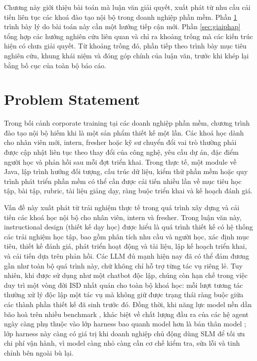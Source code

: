 \documentclass[../main.tex]{subfiles}
\begin{document}
Chương này giới thiệu bài toán mà luận văn giải quyết, xuất phát từ nhu cầu cải tiến liên tục các khoá đào tạo nội bộ trong doanh nghiệp phần mềm. Phần \ref{sec:dvd} trình bày lý do bài toán này cần một hướng tiếp cận mới. Phần \ref{sec:giaiphap} tổng hợp các hướng nghiên cứu liên quan và chỉ ra khoảng trống mà các kiến trúc hiện có chưa giải quyết. Từ khoảng trống đó, phần tiếp theo trình bày mục tiêu nghiên cứu, khung khái niệm và đóng góp chính của luận văn, trước khi khép lại bằng bố cục của toàn bộ báo cáo.

\section{Problem Statement}
\label{sec:dvd}

Trong bối cảnh corporate training tại các doanh nghiệp phần mềm, chương trình đào tạo nội bộ hiếm khi là một sản phẩm thiết kế một lần. Các khoá học dành cho nhân viên mới, intern, fresher hoặc kỹ sư chuyển đổi vai trò thường phải được cập nhật liên tục theo thay đổi của công nghệ, yêu cầu dự án, đặc điểm người học và phản hồi sau mỗi đợt triển khai. Trong thực tế, một module về Java, lập trình hướng đối tượng, cấu trúc dữ liệu, kiểm thử phần mềm hoặc quy trình phát triển phần mềm có thể cần được cải tiến nhiều lần về mục tiêu học tập, bài tập, rubric, tài liệu giảng dạy, ràng buộc triển khai và kế hoạch đánh giá.

Vấn đề này xuất phát từ trải nghiệm thực tế trong quá trình xây dựng và cải tiến các khoá học nội bộ cho nhân viên, intern và fresher. Trong luận văn này, instructional design (thiết kế dạy học) được hiểu là quá trình thiết kế có hệ thống các trải nghiệm học tập, bao gồm phân tích nhu cầu và người học, xác định mục tiêu, thiết kế đánh giá, phát triển hoạt động và tài liệu, lập kế hoạch triển khai, và cải tiến dựa trên phản hồi. Các \gls{LLM} đủ mạnh hiện nay đã có thể đảm đương gần như toàn bộ quá trình này, chứ không chỉ hỗ trợ từng tác vụ riêng lẻ. Tuy nhiên, khi được sử dụng như một chatbot độc lập, chúng còn hạn chế trong việc duy trì một vòng đời \gls{ISD} nhất quán cho toàn bộ khoá học: mỗi lượt tương tác thường xử lý độc lập một tác vụ mà không giữ được trạng thái ràng buộc giữa các thành phần thiết kế đã sinh trước đó. Đồng thời, khi năng lực model nền dần bão hoà trên nhiều benchmark \cite{deveci2025ouroboros,shukla2025scalingwall}, khác biệt về chất lượng đầu ra của các hệ agent ngày càng phụ thuộc vào lớp harness bao quanh model hơn là bản thân model \cite{cho2026harness}; lớp harness này càng có giá trị khi doanh nghiệp chủ động dùng \gls{SLM} để tối ưu chi phí vận hành, vì model càng nhỏ càng cần cơ chế kiểm tra, sửa lỗi và tinh chỉnh bên ngoài bù lại.
\end{document}

